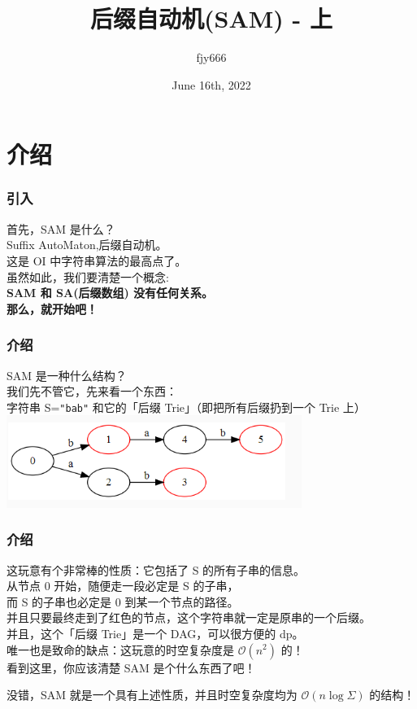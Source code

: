 \documentclass{beamer}
\title{后缀自动机(SAM) - 上}
\author{fjy666}
\date{June 16th, 2022}
\begin{document}
    \frame{\titlepage}

    \section{介绍}
    \begin{frame}
        \frametitle{引入}
        首先，SAM 是什么？ \\
        Suffix AutoMaton,后缀自动机。\\
        这是 OI 中字符串算法的最高点了。\\
        虽然如此，我们要清楚一个概念:\\
        \bf SAM 和 SA(后缀数组) 没有任何关系。\\  
        \textnormal{那么，就开始吧！}
    \end{frame}

    \begin{frame}
        \frametitle{介绍}
        SAM 是一种什么结构？\\  
        我们先不管它，先来看一个东西：\\
        字符串 S=\texttt{"bab"} 和它的「后缀 Trie」（即把所有后缀扔到一个 Trie 上）
        \includegraphics[height=3cm]{g1.png}
    \end{frame}

    \begin{frame}
        \frametitle{介绍}
        这玩意有个非常棒的性质：它包括了 S 的所有子串的信息。\\
        从节点 $0$ 开始，随便走一段必定是 S 的子串，\\
        而 S 的子串也必定是 $0$ 到某一个节点的路径。\\
        并且只要最终走到了红色的节点，这个字符串就一定是原串的一个后缀。\\
        并且，这个「后缀 Trie」是一个 DAG，可以很方便的 dp。\\
        \pause
        唯一也是致命的缺点：这玩意的时空复杂度是 $\mathcal{O}(n^2)$ 的！\\
        看到这里，你应该清楚 SAM 是个什么东西了吧！
    \end{frame}

    \begin{frame}
        没错，SAM 就是一个具有上述性质，并且时空复杂度均为 $\mathcal{O}(n\log\Sigma)$ 的结构！
    \end{frame}
\end{document}
